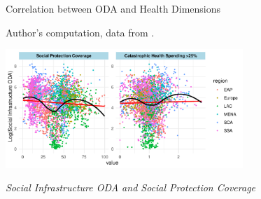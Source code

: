 \begin{figure}[H]
\captionsetup{justification=justified,singlelinecheck=false}
\caption{Correlation between ODA and Health Dimensions}
    \label{fig:Correlation_Matrix_Graph}
    \caption*{\footnotesize{Author's computation, data from \textcite{oecd_Data_2023, unsdg_sustainable_2023, wdi_world_2023}.}}
\end{figure}


\begin{figure}[H]

\caption{\textit{Social Infrastructure ODA and Social Protection Coverage}}
    \centering \includegraphics[width = 0.8\textwidth]{Figures/ODA_against_Hth/Soc_Prot_SocInfrODA_plt.pdf}
    \label{Fig::Social_Prot_Social_InfrastructureODA}
\end{figure}

